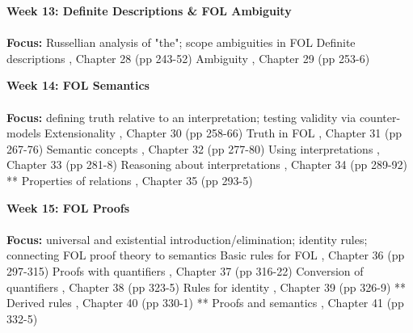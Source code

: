 \documentclass{article}
\begin{document}
\begin{outline}[enumerate]
\1 \textbf{Week 13: Definite Descriptions \& FOL Ambiguity}
\\
\\
\textbf{Focus:}
Russellian analysis of "the";
scope ambiguities in FOL
\2 Definite descriptions \3 \cite{Mag25},  Chapter 28 (pp 243-52)
\2 Ambiguity \3 \cite{Mag25},  Chapter 29 (pp 253-6)

\1 \textbf{Week 14: FOL Semantics}
\\
\\
\textbf{Focus:}
defining truth relative to an interpretation;
testing validity via counter-models
\2 Extensionality \3 \cite{Mag25},  Chapter 30 (pp 258-66)
\2 Truth in FOL \3 \cite{Mag25},  Chapter 31 (pp 267-76)
\2 Semantic concepts \3 \cite{Mag25},  Chapter 32 (pp 277-80)
\2 Using interpretations \3 \cite{Mag25},  Chapter 33 (pp 281-8)
\2 Reasoning about interpretations \3 \cite{Mag25},  Chapter 34 (pp 289-92)
\2 ** Properties of relations \3 \cite{Mag25},  Chapter 35 (pp 293-5)

\1 \textbf{Week 15: FOL Proofs}
\\
\\
\textbf{Focus:}
universal and existential introduction/elimination;
identity rules;
connecting FOL proof theory to semantics
\2 Basic rules for FOL \3 \cite{Mag25},  Chapter 36 (pp 297-315)
\2 Proofs with quantifiers \3 \cite{Mag25},  Chapter 37 (pp 316-22)
\2 Conversion of quantifiers \3 \cite{Mag25},  Chapter 38 (pp 323-5)
\2 Rules for identity \3 \cite{Mag25},  Chapter 39 (pp 326-9)
\2 ** Derived rules \3 \cite{Mag25},  Chapter 40 (pp 330-1)
\2 ** Proofs and semantics \3 \cite{Mag25},  Chapter 41 (pp 332-5)

\end{outline}

\printbibliography
\end{document}
